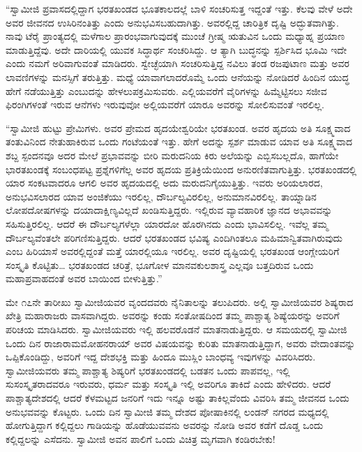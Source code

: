  “ಸ್ವಾಮೀಜಿ ಪ್ರವಾಸದಲ್ಲಿದ್ದಾಗ ಭರತಖಂಡದ ಭೂತಕಾಲದಲ್ಲೆ ಬಾಳಿ ಸಂಚರಿಸುತ್ತ ಇದ್ದಂತೆ ಇತ್ತು. ಕೆಲವು ವೇಳೆ ಅದೇ ಅವರ ಜೀವನದ ಉಸಿರಿನಂತಿತ್ತು ಎಂದು ಅನುಭವಿಸಬಹುದಾಗಿತ್ತು. ಅವರಲ್ಲಿದ್ದ ಚಾರಿತ್ರಿಕ ದೃಷ್ಟಿ ಅದ್ಭುತವಾಗಿತ್ತು. ನಾವು ಟೆರೈ ಪ್ರಾಂತ್ಯದಲ್ಲಿ ಮಳೆಗಾಲ ಪ್ರಾರಂಭವಾಗುವುದಕ್ಕೆ ಮುಂಚೆ ಗ್ರೀಷ್ಮ ಋತುವಿನ ಒಂದು ಮಧ್ಯಾಹ್ನ ಪ್ರಯಾಣ ಮಾಡುತ್ತಿದ್ದೆವು. ಅದೇ ದಾರಿಯಲ್ಲಿ ಯುವಕ ಸಿದ್ಧಾರ್ಥ ಸಂಚರಿಸಿದ್ದು. ಆ ತ್ಯಾಗಿ ಬುದ್ಧನನ್ನು ಸ್ಪರ್ಶಿಸಿದ ಭೂಮಿ ಇದೇ ಎಂದು ನಮಗೆ ಅರಿವಾಗುವಂತೆ ಮಾಡಿದರು. ಸ್ವೇಚ್ಛೆಯಾಗಿ ಸಂಚರಿಸುತ್ತಿದ್ದ ನವಿಲು ತಂಡ ರಜಪುಟಾಣ ಮತ್ತು ಅವರ ಲಾವಣಿಗಳನ್ನು ಮನಸ್ಸಿಗೆ ತರುತ್ತಿತ್ತು. ಮಧ್ಯೆ ಯಾವಾಗಲಾದರೊಮ್ಮೆ ಒಂದು ಆನೆಯನ್ನು ನೋಡಿದರೆ ಹಿಂದಿನ ಯುದ್ಧ ಹೇಗೆ ನಡೆಯುತ್ತಿತ್ತು ಎಂಬುದನ್ನು ಹೇಳಲುಪಕ್ರಮಿಸುವರು. ಎಲ್ಲಿಯವರೆಗೆ ವೈರಿಗಳನ್ನು ಹಿಮ್ಮೆಟ್ಟಿಸಲು ಸಜೀವ ಫಿರಂಗಿಗಳಂತೆ ಇರುವ ಆನೆಗಳು ಇರುವುವೋ ಅಲ್ಲಿಯವರೆಗೆ ಯಾರೂ ಅವರನ್ನು ಸೋಲಿಸುವಂತೆ ಇರಲಿಲ್ಲ. 

 “ಸ್ವಾಮೀಜಿ ಹುಟ್ಟು ಪ್ರೇಮಿಗಳು. ಅವರ ಪ್ರೇಮದ ಹೃದಯೇಶ್ವರಿಯೇ ಭರತಖಂಡ. ಅವರ ಹೃದಯ ಅತಿ ಸೂಕ್ಷ್ಮವಾದ ತಂತುವಿನಿಂದ ನೇತುಹಾಕಿರುವ ಒಂದು ಗಂಟೆಯಂತೆ ಇತ್ತು. ಹೇಗೆ ಅದನ್ನು ಸ್ಪರ್ಶ ಮಾಡುವ ಯಾವ ಅತಿ ಸೂಕ್ಷ್ಮವಾದ ಶಬ್ದ ಸ್ಪಂದನವೂ ಅದರ ಮೇಲೆ ಪ್ರಭಾವವನ್ನು ಬೀರಿ ಮರುದನಿಯ ಕಿರು ಅಲೆಯನ್ನು ಎಬ್ಬಿಸಬಲ್ಲದೊ, ಹಾಗೆಯೇ ಭಾರತಖಂಡಕ್ಕೆ ಸಂಬಂಧಪಟ್ಟ ಪ್ರಶ್ನೆಗಳಿಗೆಲ್ಲ ಅವರ ಹೃದಯ ಪ್ರತಿಕ್ರಿಯೆಯಿಂದ ಅನುರಣಿತವಾಗುತ್ತಿತ್ತು. ಭರತಖಂಡದಲ್ಲಿ ಯಾರ ಸಂಕಟವಾದರೂ ಆಗಲಿ ಅವರ ಹೃದಯದಲ್ಲಿ ಅದು ಮರುದನಿಗೈಯುತ್ತಿತ್ತು. ಇವರು ಅರಿಯಲಾರದ, ಅನುಭವಿಸಲಾರದ ಯಾವ ಅಂಜಿಕೆಯು ಇರಲಿಲ್ಲ, ದೌರ್ಬಲ್ಯವಿರಲಿಲ್ಲ, ಅನುಮಾನವಿರಲಿಲ್ಲ. ತಾಯ್ನಾಡಿನ ಲೋಪದೋಷಗಳನ್ನು ದಯಾದಾಕ್ಷಿಣ್ಯವಿಲ್ಲದೆ ಖಂಡಿಸುತ್ತಿದ್ದರು. ಇಲ್ಲಿರುವ ವ್ಯಾವಹಾರಿಕ ಜ್ಞಾನದ ಅಭಾವವನ್ನು ಸಹಿಸುತ್ತಿರಲಿಲ್ಲ. ಆದರೆ ಈ ದೌರ್ಬಲ್ಯಗಳೆಲ್ಲಾ ಯಾರದೋ ಹೊರಗಿನದು ಎಂದು ಭಾವಿಸಲಿಲ್ಲ. ಇವೆಲ್ಲ ತಮ್ಮ ದೌರ್ಬಲ್ಯವೆಂತಲೇ ಪರಿಗಣಿಸುತ್ತಿದ್ದರು. ಆದರೆ ಭರತಖಂಡದ ಭವಿಷ್ಯ ಎಂದಿಗಿಂತಲೂ ಮಹಿಮಾನ್ವಿತವಾಗಿರುವುದು ಎಂಬ ಹಿರಿಯಾಸೆ ಅವರಲ್ಲಿದ್ದಂತೆ ಮತ್ತೆ ಯಾರಲ್ಲಿಯೂ ಇರಲಿಲ್ಲ. ಅವರ ದೃಷ್ಟಿಯಲ್ಲಿ ಭರತಖಂಡ ಆಂಗ್ಲೇಯರಿಗೆ ಸಂಸ್ಕೃತಿ ಕೊಟ್ಟಿತು… ಭರತಖಂಡದ ಚರಿತ್ರೆ, ಭೂಗೋಳ ಮಾನವಕುಲಶಾಸ್ತ್ರ ಎಲ್ಲವೂ ಬತ್ತದಿರುವ ಒಂದು ಮಹಾಪ್ರವಾಹದಂತೆ ಅವರ ಬಾಯಿಂದ ಬೀಳುತ್ತಿತ್ತು.” 

 ಮೇ ೧೭ನೇ ತಾರೀಖು ಸ್ವಾಮೀಜಿಯವರ ವೃಂದದವರು ನೈನಿತಾಲನ್ನು ತಲುಪಿದರು. ಅಲ್ಲಿ ಸ್ವಾಮೀಜಿಯವರ ಶಿಷ್ಯರಾದ ಖೇತ್ರಿ ಮಹಾರಾಜರು ವಾಸವಾಗಿದ್ದರು. ಅವರನ್ನು ಕಂಡು ಸಂತೋಷದಿಂದ ತಮ್ಮ ಪಾಶ್ಚಾತ್ಯ ಶಿಷ್ಯೆಯರನ್ನು ಅವರಿಗೆ ಪರಿಚಯ ಮಾಡಿಸಿದರು. ಸ್ವಾಮೀಜಿಯವರು ಇಲ್ಲಿ ಹಲವರೊಡನೆ ಮಾತನಾಡುತ್ತಿದ್ದರು. ಆ ಸಮಯದಲ್ಲಿ ಸ್ವಾಮೀಜಿ ಒಂದು ದಿನ ರಾಜಾರಾಮಮೋಹನರಾಯ್ ಅವರ ವಿಷಯವನ್ನು ಕುರಿತು ಮಾತನಾಡುತ್ತಿದ್ದಾಗ, ಅವರು ವೇದಾಂತವನ್ನು ಒಪ್ಪಿಕೊಂಡಿದ್ದು, ಅವರಿಗೆ ಇದ್ದ ದೇಶಭಕ್ತಿ ಮತ್ತು ಹಿಂದೂ ಮುಸ್ಲಿಂ ಬಾಂಧವ್ಯ ಇವುಗಳನ್ನು ವಿವರಿಸಿದರು. ಸ್ವಾಮೀಜಿಯವರು ತಮ್ಮ ಪಾಶ್ಚಾತ್ಯ ಶಿಷ್ಯರಿಗೆ ಭರತಖಂಡದಲ್ಲಿ ಬಡತನ ಒಂದು ಪಾಪವಲ್ಲ, ಇಲ್ಲಿ ಸುಸಂಸ್ಕೃತರಾದವರೂ ಇರುವರು, ಧರ್ಮ ಮತ್ತು ಸಂಸ್ಕೃತಿ ಇಲ್ಲಿ ಅವರಿಗೂ ತಾಕಿದೆ ಎಂದು ಹೇಳಿದರು. ಆದರೆ ಪಾಶ್ಚಾತ್ಯದೇಶದಲ್ಲಿ ಆದರೆ ಕೆಳಮಟ್ಟದ ಜನರಿಗೆ ಇದು ಇನ್ನೂ ಅಷ್ಟು ತಾಕಿಲ್ಲವೆಂದು ವಿವರಿಸಿ ತಮ್ಮ ಜೀವನದ ಒಂದು ಅನುಭವವನ್ನು ಕೊಟ್ಟರು. ಒಂದು ದಿನ ಸ್ವಾಮೀಜಿ ತಮ್ಮ ದೇಶದ ಪೋಷಾಕಿನಲ್ಲಿ ಲಂಡನ್ ನಗರದ ಮಧ್ಯದಲ್ಲಿ ಹೋಗುತ್ತಿದ್ದಾಗ ಕಲ್ಲಿದ್ದಲು ಗಾಡಿಯನ್ನು ಹೊಡೆಯುವವನು ಅವರನ್ನು ನೋಡಿ ಅವರ ಕಡೆಗೆ ದೊಡ್ಡ ಒಂದು ಕಲ್ಲಿದ್ದಲನ್ನು ಎಸೆದನು. ಸ್ವಾಮೀಜಿ ಅವನ ಪಾಲಿಗೆ ಒಂದು ವಿಚಿತ್ರ ಮೃಗವಾಗಿ ಕಂಡಿರಬೇಕು! 

